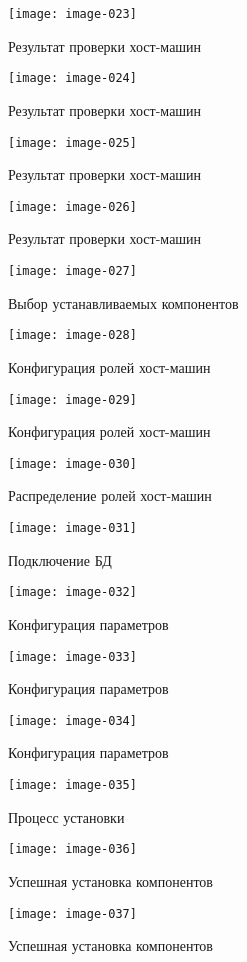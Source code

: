 \begin{figure}[ht!]
    \center
    \texttt{[image: image-023]}
    \caption{Результат проверки хост-машин}
    \texttt{[image: image-024]}
    \caption{Результат проверки хост-машин}
\end{figure}

\newpage

\begin{figure}[ht!]
    \center
    \texttt{[image: image-025]}
    \caption{Результат проверки хост-машин}
    \texttt{[image: image-026]}
    \caption{Результат проверки хост-машин}
\end{figure}

\newpage

\begin{figure}[ht!]
    \center
    \texttt{[image: image-027]}
    \caption{Выбор устанавливаемых компонентов}
    \texttt{[image: image-028]}
    \caption{Конфигурация ролей хост-машин}
\end{figure}

\newpage

\begin{figure}[ht!]
    \center
    \texttt{[image: image-029]}
    \caption{Конфигурация ролей хост-машин}
    \texttt{[image: image-030]}
    \caption{Распределение ролей хост-машин}
    \texttt{[image: image-031]}
    \caption{Подключение БД}
\end{figure}

\newpage

\begin{figure}[ht!]
    \center
    \texttt{[image: image-032]}
    \caption{Конфигурация параметров}
    \texttt{[image: image-033]}
    \caption{Конфигурация параметров}
\end{figure}

\newpage

\begin{figure}[ht!]
    \center
    \texttt{[image: image-034]}
    \caption{Конфигурация параметров}
    \texttt{[image: image-035]}
    \caption{Процесс установки}
\end{figure}

\newpage

\begin{figure}[ht!]
    \center
    \texttt{[image: image-036]}
    \caption{Успешная установка компонентов}
    \texttt{[image: image-037]}
    \caption{Успешная установка компонентов}
\end{figure}

